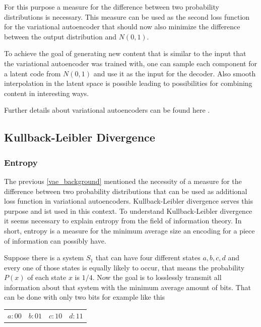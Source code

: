 For this purpose a measure for the
difference between two probability distributions is necessary. This measure can be used as the second loss
function for the variational autoencoder that should now also minimize the difference
between the output distribution and $N(0,1)$.

To achieve the goal of generating new content that is similar to the input that the variational 
autoencoder was trained with, one can sample each component for a latent code from $N(0,1)$ and
use it as the input for the decoder.
Also smooth interpolation in the latent space is possible leading to possibilities for combining
content in interesting ways.

Further details about variational autoencoders can be found here \parencite{2016-doersch-tutorial}.

\subsection{Kullback-Leibler Divergence} \label{KL-Divergence}

\subsubsection{Entropy}

The previous \autoref{vae_background} mentioned the necessity of a measure for the difference between
two probability distributions that can be used as additional loss function in variational autoencoders.
Kullback-Leibler divergence serves this purpose and ist used in this context.
To understand Kullback-Leibler divergence it seems necessary to explain entropy from
the field of information theory. In short, entropy is a measure for the minimum average size an
encoding for a piece of information can possibly have.

Suppose there is a system $S_1$ that can have four different states $a, b, c, d$
and every one of those states is equally likely to occur, that means the probability $P(x)$
of each state $x$ is $1/4$. Now the goal is to losslessly transmit all information about that system
with the minimum average amount of bits. That can be done with only two bits for example like this

\begin{center}
    \begin{tabular} {c c c c}
        $a: 00$ & $b: 01$ & $c: 10$ & $d: 11$
    \end{tabular}
\end{center}

